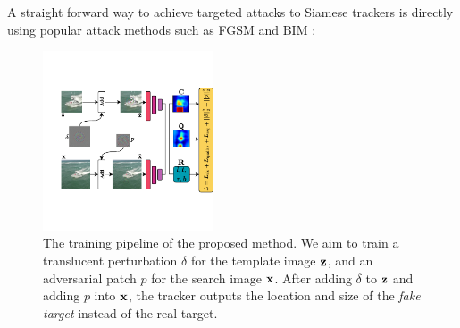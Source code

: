\documentclass[journal]{IEEEtran}
\renewcommand{\uline}{}
\begin{document}
A straight forward way to achieve targeted attacks \uline{to} Siamese trackers is directly using popular attack methods such as FGSM \cite{FGSM} and BIM \cite{DBLP:conf/iclr/KurakinGB17a}:

\begin{figure}[t]
  \centering
  \includegraphics[width=0.45\textwidth]{images_imperceptible/network_v5.pdf}
  \caption{The training pipeline of the proposed method. We aim to train a translucent perturbation $\delta$ for the template image $\textbf z$, and an adversarial patch $p$ for the search image $\textbf x$. After adding $\delta$ to $\textbf z$ and adding $p$ into $\textbf x$, the tracker outputs the location and size of the \textit{fake target} instead of the real target.}
  \label{fig:net}
  \vspace{-3mm}
\end{figure}
\end{document}
